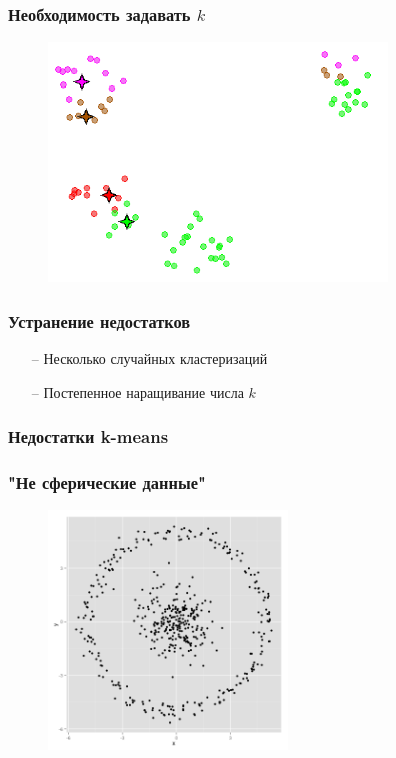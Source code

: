 \documentclass[12pt]{beamer}
\begin{document}
\begin{frame}\frametitle{Необходимость задавать $k$}
\begin{figure}[htbp]
  \includegraphics[height=180pt, keepaspectratio = true]{images/K-means_k}  
\end{figure}
\end{frame}

\begin{frame}\frametitle{Устранение недостатков}
\begin{itemize}
\item[--] Несколько случайных кластеризаций
\item[--] Постепенное наращивание числа $k$
\end{itemize}
\end{frame}

\begin{frame}\frametitle{Недостатки k-means}
\end{frame}

\begin{frame}\frametitle{"Не сферические данные"}
\begin{figure}[htbp]
  \includegraphics[height=180pt, keepaspectratio = true]{images/non_spherical-1}  
\end{figure}
\end{frame}
\end{document}
